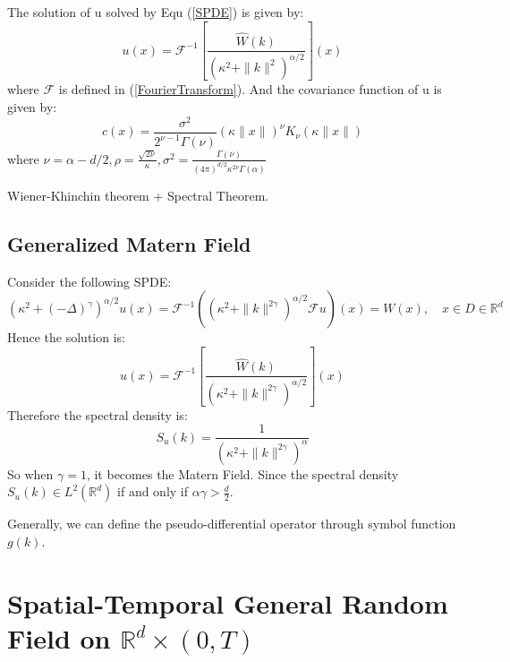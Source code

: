 \begin{theorem}\label{spectral_solution_matern}
	The solution of u solved by Equ (\ref{SPDE}) is given by:
	\begin{equation}
		u(x) = \mathcal{F}^{-1}\left[\frac{\hat{W}(k)}{(\kappa^2 + \|k\|^2)^{\alpha/2}}\right](x)
	\end{equation}
	where $\mathcal{F}$ is defined in (\ref{FourierTransform}).
	And the covariance function of u is given by:
	\begin{equation}
		c(x) = \frac{\sigma^2}{2^{\nu -1}\Gamma(\nu)}(\kappa \|x\|)^\nu K_\nu (\kappa \|x\|)
	\end{equation}
	where $\nu = \alpha - d/2, \rho = \frac{\sqrt{2\nu}}{\kappa}, \sigma^2 = \frac{\Gamma(\nu)}{(4\pi)^{d/2}\kappa^{2\nu}\Gamma(\alpha) }$
\end{theorem}



Wiener-Khinchin theorem + Spectral Theorem.
\subsection{Generalized Matern Field}
Consider the following SPDE:
\begin{equation}\label{GWM}
	(\kappa^2 +(- \Delta)^{\gamma})^{\alpha/2}u(x)=\mathcal{F}^{-1}\left((\kappa^2 + \|k\|^{2\gamma})^{\alpha/2}\mathcal{F}u\right)(x) = W(x), \quad x\in D\in \mathbb{R}^d
\end{equation}
Hence the solution is:
\begin{equation}
	u(x)=\mathcal{F}^{-1}\left[\frac{\hat{W}(k)}{(\kappa^2 + \|k\|^{2\gamma})^{\alpha/2}}\right](x)
\end{equation}
Therefore the spectral density is:
\begin{equation}
	S_u(k)=\frac{1}{(\kappa^2 + \|k\|^{2\gamma})^{\alpha}}
\end{equation}
So when $\gamma = 1$, it becomes the Matern Field. Since  the spectral density $S_u(k)\in L^2(\mathbb{R}^d)$ if and only if $\alpha \gamma > \frac{d}{2}$.

Generally, we can define the pseudo-differential operator through symbol function $g(k)$.
\section{Spatial-Temporal General Random Field on $\mathbb{R}^d\times (0, T)$}
